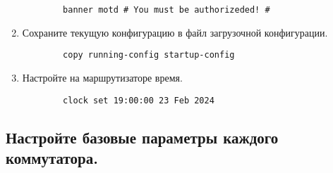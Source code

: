 \begin{enumerate}[a]
    \begin{verbatim}
        banner motd # You must be authorizeded! #
    \end{verbatim}
    \item Сохраните текущую конфигурацию в файл загрузочной конфигурации.
    \begin{verbatim}
        copy running-config startup-config
    \end{verbatim}
    \item Настройте на маршрутизаторе время.
    \begin{verbatim}
        clock set 19:00:00 23 Feb 2024
    \end{verbatim}
\end{enumerate}



\subsection{Настройте базовые параметры каждого коммутатора.}

